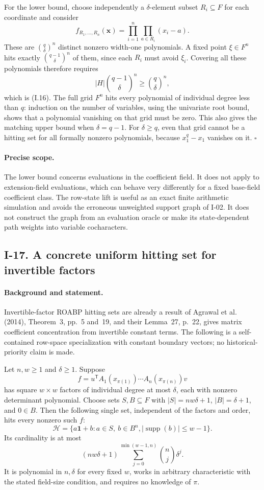 For the lower bound, choose independently a $\delta$-element subset
$R_i\subseteq F$ for each coordinate and consider
\[
 f_{R_1,\ldots,R_n}(\mathbf x)
     =\prod_{i=1}^n\prod_{a\in R_i}(x_i-a).
\]
These are $\binom{q}{\delta}^{n}$ distinct nonzero width-one polynomials.
A fixed point $\xi\in F^n$ hits exactly
$\binom{q-1}{\delta}^n$ of them, since each $R_i$ must avoid
$\xi_i$.  Covering all these polynomials therefore requires
\[
 |H|\binom{q-1}{\delta}^n\ge\binom{q}{\delta}^{n},
\]
which is (I.16).  The full grid $F^n$ hits every polynomial of
individual degree less than $q$: induction on the number of variables,
using the univariate root bound, shows that a polynomial vanishing
on that grid must be zero.  This also gives the matching upper bound
when $\delta=q-1$.  For $\delta\ge q$, even that grid cannot be a
hitting set for all formally nonzero polynomials, because
$x_1^q-x_1$ vanishes on it. \hfill$\square$

\paragraph{Precise scope.}
The lower bound concerns evaluations in the coefficient field.
It does not apply to extension-field evaluations, which can behave
very differently for a fixed base-field coefficient class.
The row-state lift is useful as an exact finite arithmetic simulation
and avoids the erroneous unweighted support graph of I-02.
It does not construct the graph from an evaluation oracle or make
its state-dependent path weights into variable cocharacters.

\subsection{I-17. A concrete uniform hitting set for invertible factors}
\label{I-17}

\paragraph{Background and statement.}
Invertible-factor ROABP hitting sets are already a result of
Agrawal et al. (2014), Theorem~3, pp.~5 and~19, and their
Lemma~27, p.~22, gives matrix coefficient concentration from
invertible constant terms.  The following is a self-contained
row-space specialization with constant boundary vectors; no
historical-priority claim is made.

Let $n,w\ge1$ and $\delta\ge1$.  Suppose
\[
 f=u^{\mathsf T}A_1(x_{\pi(1)})\cdots A_n(x_{\pi(n)})v
\]
has square $w\times w$ factors of individual degree at most
$\delta$, each with nonzero determinant polynomial.
Choose sets $S,B\subseteq F$ with
$|S|=nw\delta+1$, $|B|=\delta+1$, and $0\in B$.
Then the following single set, independent of the factors and order,
hits every nonzero such $f$:
\[
 \mathcal H=\{a\mathbf1+b: a\in S,\ b\in B^n,
                         |\operatorname{supp}(b)|\le w-1\}.
\tag{I.17}\label{eq:I-invertible-hit}
\]
Its cardinality is at most
\[
 (nw\delta+1)\sum_{j=0}^{\min(w-1,n)}\binom nj\delta^j.
\]
It is polynomial in $n,\delta$ for every fixed $w$, works in arbitrary
characteristic with the stated field-size condition, and requires
no knowledge of $\pi$.

